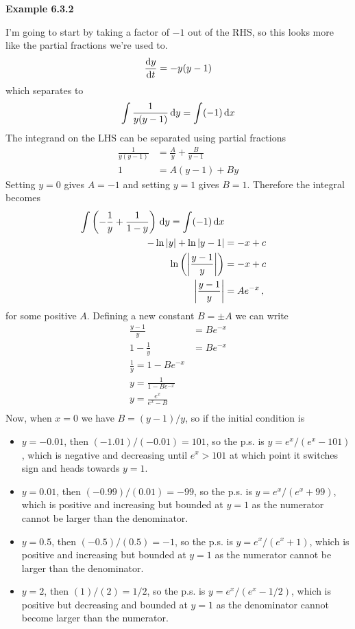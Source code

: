 \vspace{10mm}
\textbf{Example 6.3.2}

I'm going to start by taking a factor of $-1$ out of the RHS, so this looks more like the partial fractions we're used to. 
\begin{align*}
\frac{{\rm d} y}{{\rm d} t} = - y(y-1)
\end{align*}
which separates to
\begin{align*}
\int \frac{1}{y(y-1)} \, {\rm d} y = \int (-1) \, {\rm d} x 
\end{align*}
The integrand on the LHS can be separated using partial fractions
\begin{align*}
\frac{1}{y(y-1)} &= \frac{A}{y} + \frac{B}{y-1}\\
1 &= A(y-1) + By
\end{align*}
Setting $y=0$ gives $A=-1$ and setting $y=1$ gives $B=1$. Therefore the integral becomes
\begin{align*}
\int \left(-\frac{1}{y} + \frac{1}{1-y}\right) \, {\rm d} y = \int (-1) \, {\rm d} x \\
-\ln|y| + \ln|y-1| &= -x + c \\
\ln\left(\left| \frac{y-1}{y} \right|\right) &= -x + c \\
\left| \frac{y-1}{y} \right| &= Ae^{-x} \, ,
\end{align*}
for some positive $A$. Defining a new constant $B = \pm A$ we can write
\begin{align*}
\frac{y-1}{y} &= Be^{-x} \\
1 - \frac{1}{y} &= Be^{-x} \\
 \frac{1}{y} = 1 -  Be^{-x} \\
 y = \frac{1}{1 - Be^{-x}} \\
 y = \frac{e^x}{e^{x} - B} \\
\end{align*}
Now, when $x=0$ we have $B = (y-1)/y$, so if the initial condition is
\begin{itemize}
\item $y= -0.01$, then $(-1.01)/(-0.01) = 101$, so the p.s. is $y = e^x/(e^x - 101)$, which is negative and decreasing until $e^x > 101$ at which point it switches sign and heads towards $y = 1$.
\item $y= 0.01$, then $(-0.99)/(0.01) = -99$, so the p.s. is $y = e^x/(e^x + 99)$, which is positive and increasing but bounded at $y = 1$ as the numerator cannot be larger than the denominator.
\item $y = 0.5$, then  $(-0.5)/(0.5) = -1$, so the p.s. is $y = e^x/(e^x + 1)$, which is positive and increasing but bounded at $y = 1$ as the numerator cannot be larger than the denominator.
\item $y = 2$, then  $(1)/(2) = 1/2$, so the p.s. is $y = e^x/(e^x - 1/2)$, which is positive but decreasing and bounded at $y = 1$ as the denominator cannot become larger than the numerator.
\end{itemize}
